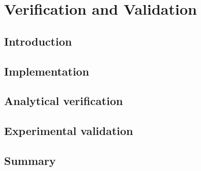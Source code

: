 \chapter{Verification and Validation}
\section{Introduction}
\section{Implementation}

\section{Analytical verification}


\section{Experimental validation}

\section{Summary}